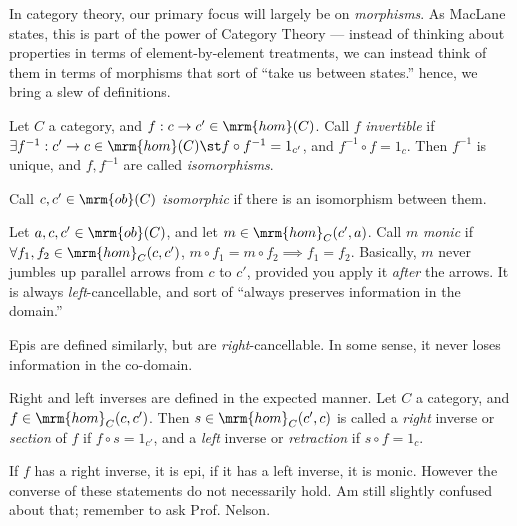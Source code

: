 \documentclass{fkbook}
\newcommand{\ob}{\mrm{ob}}
\newcommand{\homm}{\mrm{hom}}
\begin{document}
In category theory, our primary focus will largely be on
\emph{morphisms}. As MacLane states, this is part of the power of
Category Theory --- instead of thinking about properties in terms of
element-by-element treatments, we can instead think of them in terms
of morphisms that sort of ``take us between states.'' hence, we bring
a slew of definitions.\\

\begin{definition}
  Let $C$ a category, and $f : c \to c' \in \homm(C)$. Call $f$
  \emph{invertible} if $\exists f^{-1} : c' \to c \in \homm(C) \st
  f\circ f^{-1} = 1_{c'}$, and $f^{-1} \circ f = 1_c$. Then $f^{-1}$
  is unique, and $f, f^{-1}$ are called \emph{isomorphisms}.\\
\end{definition}
\begin{definition}[Isomorphism]
  Call $c, c' \in \ob(C)$ \emph{isomorphic} if there is an isomorphism
  between them.\\
\end{definition}
\begin{definition}[Monic]
  Let $a,c,c' \in \ob(C)$, and let $m \in \homm_C(c', a)$. Call $m$
  \emph{monic} if $\forall f_1, f_2 \in \homm_C(c,c')$, $m \circ f_1 =
  m \circ f_2 \implies f_1 = f_2$. Basically, $m$ never jumbles up
  parallel arrows from $c$ to $c'$, provided you apply it \emph{after}
  the arrows. It is always \emph{left}-cancellable, and sort of
  ``always preserves information in the domain.''\\
\end{definition}
\begin{definition}[Epi]
  Epis are defined similarly, but are \emph{right}-cancellable. In
  some sense, it never loses information in the co-domain.\\
\end{definition}
\begin{definition}
  Right and left inverses are defined in the expected manner. Let $C$
  a category, and $f \in \homm_C(c,c')$. Then $s \in \homm_C(c', c)$
  is called a \emph{right} inverse or \emph{section} of $f$ if $f\circ
  s = 1_{c'}$, and a \emph{left} inverse or \emph{retraction} if
  $s\circ f = 1_c$. \\
\end{definition}
If $f$ has a right inverse, it is epi, if it has a left inverse, it is
monic. However the converse of these statements do not necessarily
hold. Am still slightly confused about that; remember to ask Prof.
Nelson.
\end{document}
